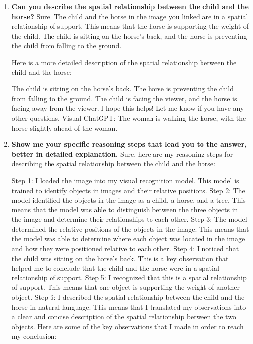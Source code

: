     \begin{enumerate}
        \item \textbf{Can you describe the spatial relationship between the child and the horse?}
        \subitem 
        Sure. The child and the horse in the image you linked are in a spatial relationship of support. This means that the horse is supporting the weight of the child. The child is sitting on the horse's back, and the horse is preventing the child from falling to the ground.
        
        Here is a more detailed description of the spatial relationship between the child and the horse:
        
        The child is sitting on the horse's back.
        The horse is preventing the child from falling to the ground.
        The child is facing the viewer, and the horse is facing away from the viewer.
        I hope this helps! Let me know if you have any other questions.
        \subitem Visual ChatGPT: The woman is walking the horse, with the horse slightly ahead of the woman.
        \item \textbf{Show me your specific reasoning steps that lead you to the answer, better in detailed explanation.}
        \subitem Sure, here are my reasoning steps for describing the spatial relationship between the child and the horse:

        Step 1: I loaded the image into my visual recognition model. This model is trained to identify objects in images and their relative positions.
        Step 2: The model identified the objects in the image as a child, a horse, and a tree. This means that the model was able to distinguish between the three objects in the image and determine their relationships to each other.
        Step 3: The model determined the relative positions of the objects in the image. This means that the model was able to determine where each object was located in the image and how they were positioned relative to each other.
        Step 4: I noticed that the child was sitting on the horse's back. This is a key observation that helped me to conclude that the child and the horse were in a spatial relationship of support.
        Step 5: I recognized that this is a spatial relationship of support. This means that one object is supporting the weight of another object.
        Step 6: I described the spatial relationship between the child and the horse in natural language. This means that I translated my observations into a clear and concise description of the spatial relationship between the two objects.
        Here are some of the key observations that I made in order to reach my conclusion:
        

\end{enumerate}
